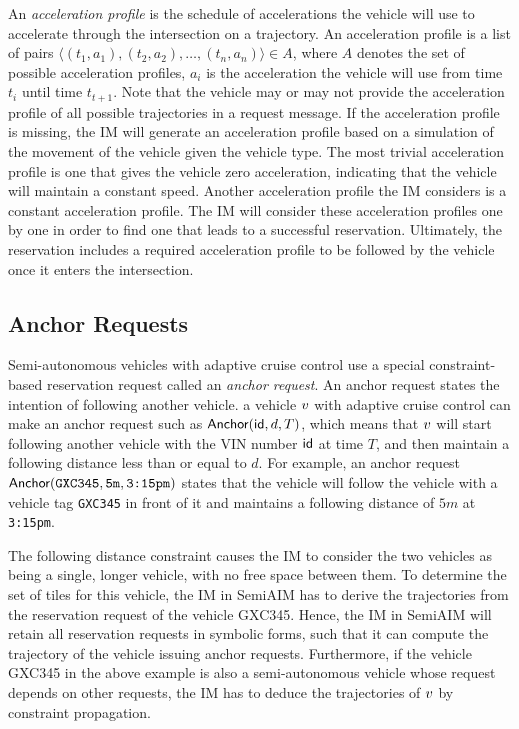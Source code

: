 An \emph{acceleration profile} is the schedule of accelerations the
vehicle will use to accelerate through the intersection on a
trajectory. An acceleration profile is a list of pairs $\langle (t_1,
a_1), (t_2, a_2), \ldots, (t_n, a_n) \rangle \in A$, where $A$ denotes
the set of possible acceleration profiles, $a_i$ is the acceleration
the vehicle will use from time $t_i$ until time $t_{t+1}$.  Note that
the vehicle may or may not provide the acceleration profile of all
possible trajectories in a request message.  If the acceleration
profile is missing, the IM will generate an acceleration profile based
on a simulation of the movement of the vehicle given the vehicle type.
The most trivial acceleration profile is one that gives the vehicle
zero acceleration, indicating that the vehicle will maintain a
constant speed.  Another acceleration profile the IM considers is a
constant acceleration profile.  The IM will consider these
acceleration profiles one by one in order to find one that leads to a
successful reservation.  Ultimately, the reservation includes a
required acceleration profile to be followed by the vehicle once it
enters the intersection.


\subsection{Anchor Requests}
\label{sec:anchor}

Semi-autonomous vehicles with adaptive cruise control use a special
constraint-based reservation request called an \emph{anchor request}.
An anchor request states the intention of following another vehicle.
a vehicle $v$ with adaptive cruise control can make an anchor
request such as $\textsf{Anchor}(\textsf{id}, d, T)$, which means that $v$ will
start following another vehicle with the VIN number $\textsf{id}$ at time
$T$, and then maintain a following distance less than or equal to $d$.
For example, an anchor request $\textsf{Anchor}(\texttt{GXC345}, {\tt 5m},
\texttt{3:15pm})$ states that the vehicle will follow the vehicle with
a vehicle tag {\tt GXC345} in front of it and maintains a following
distance of $5m$ at \texttt{3:15pm}.

The following distance constraint causes the IM to consider the two
vehicles as being a single, longer vehicle, with no free space between
them.  To determine the set of tiles for this vehicle, the IM in
SemiAIM has to derive the trajectories from the reservation request of
the vehicle GXC345.  Hence, the IM in SemiAIM will retain all
reservation requests in symbolic forms, such that it can compute the
trajectory of the vehicle issuing anchor requests.  Furthermore, if
the vehicle GXC345 in the above example is also a semi-autonomous
vehicle whose request depends on other requests, the IM has to deduce
the trajectories of $v$ by constraint propagation.

